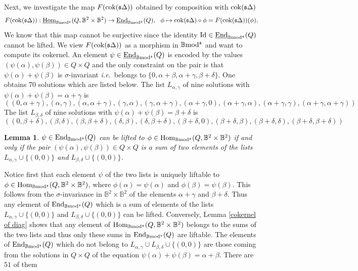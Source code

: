 \documentclass[12pt]{article}
\newtheorem{lem}[thm]{Lemma}
\def\End{{\rm End}}
\def\Hom{{\rm Hom}}
\def\Homi{{\underline{\rm Hom}}}
\def\Endi{{\underline{\rm End}}}
\def\id{{\rm id}}
\def\scoker{{\rm cok}}
\def\B{{\mathbb B}}
\newcommand{\ie}{{\it i.e.\/}\ }
\def\id{{\mbox{Id}}}
\def\Hom {{\mbox{Hom}}}
\def\End{{\mbox{End}}}
\def\yb{\mathfrak{s}}
\def\b2{{\rm \B mod^{\mathfrak s}}}
\begin{document}
Next, we investigate the map $F(\scoker(\yb\Delta))$ obtained by composition with $\scoker(\yb\Delta)$
$$
F(\scoker(\yb\Delta)): \Homi_\b2(Q,\B^2\times \B^2)\to \Endi_\b2(Q),\  \   \phi\mapsto \scoker(\yb\Delta)\circ \phi=F(\scoker(\yb\Delta))(\phi).
$$
We know that this map cannot be surjective since the identity $\id\in \Endi_\b2(Q)$ cannot be lifted. We view $F(\scoker(\yb\Delta))$ as a morphism in $\b2$ and want to compute its cokernel. An element $\psi\in \Endi_\b2(Q)$ is encoded by the values $(\psi(\alpha),\psi(\beta))\in Q\times Q$ and the only constraint on the pair is that $\psi(\alpha)+\psi(\beta)$ is $\sigma$-invariant \ie belongs to $
\{0,\alpha +\beta,\alpha +\gamma,\beta +\delta\}
$. One obtains 70 solutions which are listed below. The list $L_{\alpha,\gamma}$ of nine solutions with $\psi(\alpha)+\psi(\beta)=\alpha+\gamma$ is
$$
((0,\alpha+\gamma),(\alpha,\gamma),(\alpha,\alpha+\gamma),(\gamma,\alpha),(\gamma,\alpha+\gamma),(\alpha+\gamma,0),(\alpha+\gamma,\alpha),(\alpha+\gamma,\gamma),(\alpha+\gamma,\alpha+\gamma))
$$
The list $L_{\beta,\delta}$ of nine solutions with  $\psi(\alpha)+\psi(\beta)=\beta +\delta$ is
$$
((0,\beta+\delta),(\beta,\delta),(\beta,\beta+\delta),(\delta,\beta),(\delta,\beta+\delta),(\beta+\delta,0),(\beta+\delta,\beta),(\beta+\delta,\delta),(\beta+\delta,\beta+\delta))
$$
\begin{lem}\label{condition to lift0}  $\psi\in \End_\b2(Q)$ can be lifted to $\phi \in  \Hom_\b2(Q,\B^2\times \B^2)$ if and only if the pair $(\psi(\alpha),\psi(\beta))\in Q\times Q$ is a sum of two elements of the  lists $L_{\alpha,\gamma} \cup\{(0,0)\}$ and  $L_{\beta,\delta} \cup\{(0,0)\}$.
\end{lem}
\proof Notice first that each element $\psi$ of the two lists is uniquely liftable to $\phi \in  \Hom_\b2(Q,\B^2\times \B^2)$, where $\phi(\alpha)=\psi(\alpha)$ and $\phi(\beta)=\psi(\beta)$. This follows from the $\sigma$-invariance in $\B^2\times \B^2$ of the elements $\alpha+\gamma$ and $\beta+\delta$. Thus any element of $\End_\b2(Q)$ which is a sum of elements of the  lists $L_{\alpha,\gamma} \cup\{(0,0)\}$ and  $L_{\beta,\delta} \cup\{(0,0)\}$ can be lifted. Conversely, Lemma \ref{cokernel of diag} shows that any element of $\Hom_\b2(Q,\B^2\times \B^2)$ belongs to the sums of the two lists and thus only these sums in 
$\End_\b2(Q)$ are liftable.
\endproof 
The elements of $\End_\b2(Q)$ which do not belong to $L_{\alpha,\gamma} \cup L_{\beta,\delta} \cup\{(0,0)\}$ are those coming 
from the  solutions in $Q\times Q$ of the equation $\psi(\alpha)+\psi(\beta)=\alpha+\beta$. There are $51$ of them
\end{document}
